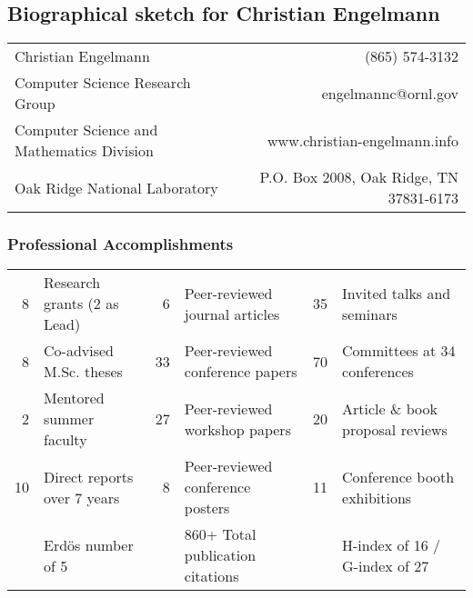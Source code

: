 
\subsection{Biographical sketch for Christian Engelmann}

\begin{tabular*}{\textwidth}
{@{}l@{\extracolsep{\fill}}r@{}}
Christian Engelmann                       &
(865) 574-3132                            \\
Computer Science Research Group           &
engelmannc@ornl.gov                       \\
Computer Science and Mathematics Division &
www.christian-engelmann.info              \\
Oak Ridge National Laboratory             &
P.O. Box 2008, Oak Ridge, TN 37831-6173   \\
\end{tabular*}

\vspace*{-2ex}
\subsubsection*{Professional Accomplishments}
\vspace*{-1ex}

\begin{tabular*}{\textwidth}
{@{}r@{~}
    l@{~~~}
    r@{~}
    l@{~~~}
    r@{~}
    l@{}}
8  & Research grants (2 as Lead)      &
6  & Peer-reviewed journal articles   &
35 & Invited talks and seminars       \\
8  & Co-advised M.Sc. theses          &
33 & Peer-reviewed conference papers  &
70 & Committees at 34 conferences     \\
2  & Mentored summer faculty          &
27 & Peer-reviewed workshop papers    &
20 & Article \& book proposal reviews \\
10 & Direct reports over 7 years      &
8  & Peer-reviewed conference posters &
11 & Conference booth exhibitions     \\
   & Erd\"{o}s number of 5            &
   & 860+ Total publication citations &
   & H-index of 16 / G-index of 27    \\
\end{tabular*}

